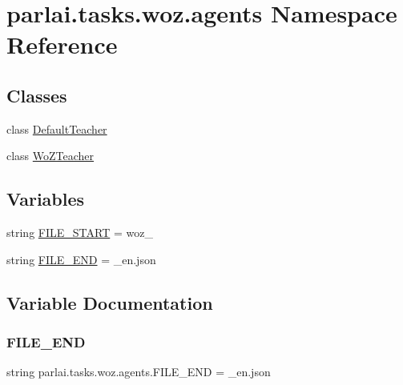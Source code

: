 \hypertarget{namespaceparlai_1_1tasks_1_1woz_1_1agents}{}\section{parlai.\+tasks.\+woz.\+agents Namespace Reference}
\label{namespaceparlai_1_1tasks_1_1woz_1_1agents}
\subsection*{Classes}
\begin{DoxyCompactItemize}
\item 
class \hyperlink{classparlai_1_1tasks_1_1woz_1_1agents_1_1DefaultTeacher}{Default\+Teacher}
\item 
class \hyperlink{classparlai_1_1tasks_1_1woz_1_1agents_1_1WoZTeacher}{Wo\+Z\+Teacher}
\end{DoxyCompactItemize}
\subsection*{Variables}
\begin{DoxyCompactItemize}
\item 
string \hyperlink{namespaceparlai_1_1tasks_1_1woz_1_1agents_a4b99fd566cc1c5d06f87a31cb8cc41c1}{F\+I\+L\+E\+\_\+\+S\+T\+A\+RT} = \textquotesingle{}woz\+\_\+\textquotesingle{}
\item 
string \hyperlink{namespaceparlai_1_1tasks_1_1woz_1_1agents_ab9b76f5208e89ebd21a2b8fb2122910f}{F\+I\+L\+E\+\_\+\+E\+ND} = \textquotesingle{}\+\_\+en.\+json\textquotesingle{}
\end{DoxyCompactItemize}


\subsection{Variable Documentation}
\mbox{\label{namespaceparlai_1_1tasks_1_1woz_1_1agents_ab9b76f5208e89ebd21a2b8fb2122910f}} 
\subsubsection{\texorpdfstring{F\+I\+L\+E\+\_\+\+E\+ND}{FILE\_END}}
{\footnotesize\ttfamily string parlai.\+tasks.\+woz.\+agents.\+F\+I\+L\+E\+\_\+\+E\+ND = \textquotesingle{}\+\_\+en.\+json\textquotesingle{}}



